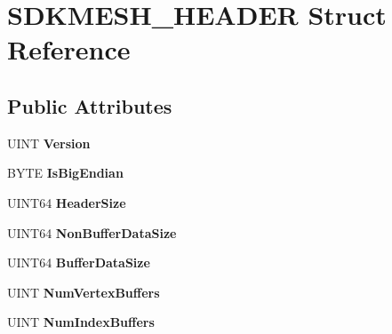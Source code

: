 \hypertarget{struct_s_d_k_m_e_s_h___h_e_a_d_e_r}{\section{S\+D\+K\+M\+E\+S\+H\+\_\+\+H\+E\+A\+D\+E\+R Struct Reference}
\label{struct_s_d_k_m_e_s_h___h_e_a_d_e_r}
}
\subsection*{Public Attributes}
\begin{DoxyCompactItemize}
\item 
\hypertarget{struct_s_d_k_m_e_s_h___h_e_a_d_e_r_a838fe1a7c42dd900e8599057a3915ab0}{U\+I\+N\+T {\bfseries Version}}\label{struct_s_d_k_m_e_s_h___h_e_a_d_e_r_a838fe1a7c42dd900e8599057a3915ab0}

\item 
\hypertarget{struct_s_d_k_m_e_s_h___h_e_a_d_e_r_ac9e6254b06069a06d7179bc0adfadd7f}{B\+Y\+T\+E {\bfseries Is\+Big\+Endian}}\label{struct_s_d_k_m_e_s_h___h_e_a_d_e_r_ac9e6254b06069a06d7179bc0adfadd7f}

\item 
\hypertarget{struct_s_d_k_m_e_s_h___h_e_a_d_e_r_aef5e06063f0a7f505cf6e3f41100c66a}{U\+I\+N\+T64 {\bfseries Header\+Size}}\label{struct_s_d_k_m_e_s_h___h_e_a_d_e_r_aef5e06063f0a7f505cf6e3f41100c66a}

\item 
\hypertarget{struct_s_d_k_m_e_s_h___h_e_a_d_e_r_a1bc5eda3677c1e0a6d7b6da6782ea213}{U\+I\+N\+T64 {\bfseries Non\+Buffer\+Data\+Size}}\label{struct_s_d_k_m_e_s_h___h_e_a_d_e_r_a1bc5eda3677c1e0a6d7b6da6782ea213}

\item 
\hypertarget{struct_s_d_k_m_e_s_h___h_e_a_d_e_r_a6b1eea99979a804efcaf2c90aa36110a}{U\+I\+N\+T64 {\bfseries Buffer\+Data\+Size}}\label{struct_s_d_k_m_e_s_h___h_e_a_d_e_r_a6b1eea99979a804efcaf2c90aa36110a}

\item 
\hypertarget{struct_s_d_k_m_e_s_h___h_e_a_d_e_r_a0567d16f1bda82858c1ed204215978a1}{U\+I\+N\+T {\bfseries Num\+Vertex\+Buffers}}\label{struct_s_d_k_m_e_s_h___h_e_a_d_e_r_a0567d16f1bda82858c1ed204215978a1}

\item 
\hypertarget{struct_s_d_k_m_e_s_h___h_e_a_d_e_r_a37cb6362ad54b9dbdf3e2408abcc6a14}{U\+I\+N\+T {\bfseries Num\+Index\+Buffers}}\label{struct_s_d_k_m_e_s_h___h_e_a_d_e_r_a37cb6362ad54b9dbdf3e2408abcc6a14}


\end{DoxyCompactItemize}
